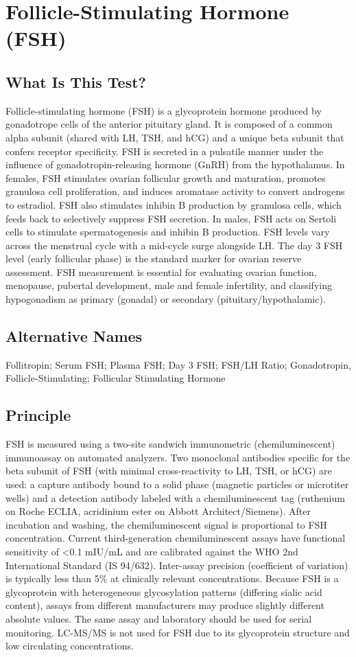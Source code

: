 \chapter{Follicle-Stimulating Hormone (FSH)}

\section*{What Is This Test?}
Follicle-stimulating hormone (FSH) is a glycoprotein hormone produced by gonadotrope cells of the anterior pituitary gland. It is composed of a common alpha subunit (shared with LH, TSH, and hCG) and a unique beta subunit that confers receptor specificity. FSH is secreted in a pulsatile manner under the influence of gonadotropin-releasing hormone (GnRH) from the hypothalamus. In females, FSH stimulates ovarian follicular growth and maturation, promotes granulosa cell proliferation, and induces aromatase activity to convert androgens to estradiol. FSH also stimulates inhibin B production by granulosa cells, which feeds back to selectively suppress FSH secretion. In males, FSH acts on Sertoli cells to stimulate spermatogenesis and inhibin B production. FSH levels vary across the menstrual cycle with a mid-cycle surge alongside LH. The day 3 FSH level (early follicular phase) is the standard marker for ovarian reserve assessment. FSH measurement is essential for evaluating ovarian function, menopause, pubertal development, male and female infertility, and classifying hypogonadism as primary (gonadal) or secondary (pituitary/hypothalamic).

\section*{Alternative Names}
Follitropin; Serum FSH; Plasma FSH; Day 3 FSH; FSH/LH Ratio; Gonadotropin, Follicle-Stimulating; Follicular Stimulating Hormone

\section*{Principle}
FSH is measured using a two-site sandwich immunometric (chemiluminescent) immunoassay on automated analyzers. Two monoclonal antibodies specific for the beta subunit of FSH (with minimal cross-reactivity to LH, TSH, or hCG) are used: a capture antibody bound to a solid phase (magnetic particles or microtiter wells) and a detection antibody labeled with a chemiluminescent tag (ruthenium on Roche ECLIA, acridinium ester on Abbott Architect/Siemens). After incubation and washing, the chemiluminescent signal is proportional to FSH concentration. Current third-generation chemiluminescent assays have functional sensitivity of <0.1 mIU/mL and are calibrated against the WHO 2nd International Standard (IS 94/632). Inter-assay precision (coefficient of variation) is typically less than 5\% at clinically relevant concentrations. Because FSH is a glycoprotein with heterogeneous glycosylation patterns (differing sialic acid content), assays from different manufacturers may produce slightly different absolute values. The same assay and laboratory should be used for serial monitoring. LC-MS/MS is not used for FSH due to its glycoprotein structure and low circulating concentrations.

